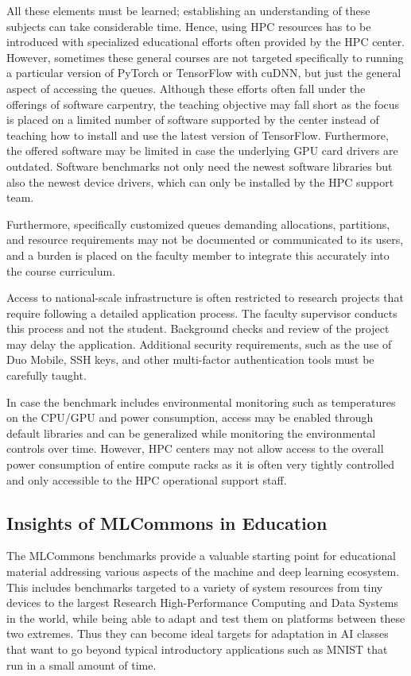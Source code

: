 \documentclass[utf8]{FrontiersinVancouver} %
\begin{document}
All these elements must be learned; establishing an understanding of these subjects can take considerable time. Hence, using HPC resources has to be introduced with specialized educational efforts often provided by the HPC center. However, sometimes these general courses are not targeted specifically to running a particular version of PyTorch or TensorFlow with cuDNN, but just the general aspect of accessing the queues. Although these efforts often fall under the offerings of software carpentry, the teaching objective may fall short as the focus is placed on a limited number of software supported by the center instead of teaching how to install and use the latest version of TensorFlow. Furthermore, the offered software may be limited in case the underlying GPU card drivers are outdated. Software benchmarks not only need the newest software libraries but also the newest device drivers, which can only be installed by the HPC support team.

Furthermore, specifically customized queues demanding allocations, partitions, and resource requirements may not be documented or communicated to its users, and a burden is placed on the faculty member to integrate this accurately into the course curriculum.

Access to national-scale infrastructure is often restricted to research projects that require following a detailed application process. The faculty supervisor conducts this process and not the student. Background checks and review of the project may delay the application. Additional security requirements, such as the use of Duo Mobile, SSH keys, and other multi-factor authentication tools must be carefully taught.

In case the benchmark includes environmental monitoring such as temperatures on the CPU/GPU and power consumption, access may be enabled through default libraries and can be generalized while monitoring the environmental controls over time. However, HPC centers may not allow access to the overall power consumption of entire compute racks as it is often very tightly controlled and only accessible to the HPC operational support staff.

\subsection{Insights of MLCommons in Education}
\label{sec:edu-mlcommons-insights}

The MLCommons benchmarks provide a valuable starting point for educational material addressing various aspects of the machine and deep learning ecosystem. This includes benchmarks targeted to a variety of system resources from tiny devices to the largest Research High-Performance Computing and Data Systems in the world, while being able to adapt and test them on platforms between these two extremes. Thus they can become ideal targets for adaptation in AI classes that want to go beyond typical introductory applications such as MNIST that run in a small amount of time.
\end{document}

